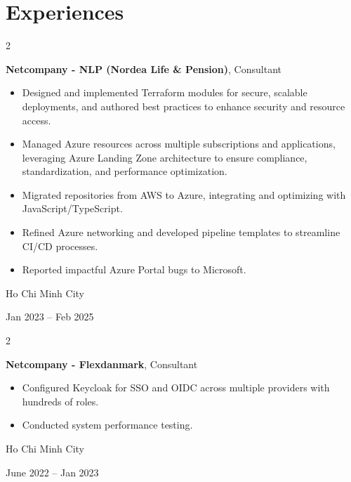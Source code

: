 \documentclass[10pt, a4paper]{article}
\newenvironment{highlights}{
    \begin{itemize}[
        topsep=0.12 cm,
        parsep=0.10 cm,
        partopsep=0pt,
        itemsep=0pt,
        leftmargin=0.4 cm + 10pt
    ]
}{
    \end{itemize}
} %
\newenvironment{twocolentry}[2][]{
    \onecolentry
    \def\secondColumn{#2}
    \setcolumnwidth{\fill, 4.5 cm}
    \begin{paracol}{2}
}{
    \switchcolumn \raggedleft \secondColumn
    \end{paracol}
    \endonecolentry
} %
\begin{document}
    
    \section{Experiences}



        
        \begin{twocolentry}{
            Ho Chi Minh City

        Jan 2023 – Feb 2025
        }
            \textbf{Netcompany - NLP (Nordea Life \& Pension)}, Consultant
            \begin{highlights}
                \item Designed and implemented Terraform modules for secure, scalable deployments, and authored best practices to enhance security and resource access.
                \item Managed Azure resources across multiple subscriptions and applications, leveraging Azure Landing Zone architecture to ensure compliance, standardization, and performance optimization.
                \item Migrated repositories from AWS to Azure, integrating and optimizing with JavaScript/TypeScript.
                \item Refined Azure networking and developed pipeline templates to streamline CI/CD processes.
                \item Reported impactful Azure Portal bugs to Microsoft.
            \end{highlights}
        \end{twocolentry}


        \vspace{0.2 cm}

        \begin{twocolentry}{
            Ho Chi Minh City

        June 2022 – Jan 2023
        }
            \textbf{Netcompany - Flexdanmark}, Consultant
            \begin{highlights}
                \item Configured Keycloak for SSO and OIDC across multiple providers with hundreds of roles.
                \item Conducted system performance testing.
            \end{highlights}
        \end{twocolentry}


        \vspace{0.2 cm}
\end{document}
